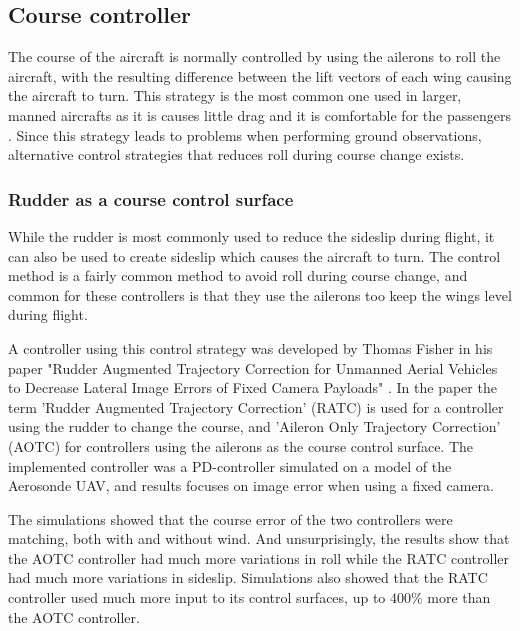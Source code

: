 \subsection{Course controller}
The course of the aircraft is normally controlled by using the ailerons to roll the aircraft, with the resulting difference between the lift vectors of each wing causing the aircraft to turn. This strategy is the most common one used in larger, manned aircrafts as it is causes little drag and it is comfortable for the passengers \cite{skidToTurnMills}. Since this strategy leads to problems when performing ground observations, alternative control strategies that reduces roll during course change exists.

\subsubsection{Rudder as a course control surface}
While the rudder is most commonly used to reduce the sideslip during flight, it can also be used to create sideslip which causes the aircraft to turn. The control method is a fairly common method to avoid roll during course change, and common for these controllers is that they use the ailerons too keep the wings level during flight.

A controller using this control strategy was developed by Thomas Fisher in his paper "Rudder Augmented Trajectory Correction for Unmanned Aerial Vehicles to Decrease Lateral Image Errors of Fixed Camera Payloads" \cite{ratcFISHER}. In the paper the term 'Rudder Augmented Trajectory Correction' (RATC) is used for a controller using the rudder to change the course, and 'Aileron Only Trajectory Correction' (AOTC) for controllers using the ailerons as the course control surface. The implemented controller was a PD-controller simulated on a model of the Aerosonde UAV, and results focuses on image error when using a fixed camera.


The simulations showed that the course error of the two controllers were matching, both with and without wind. And unsurprisingly, the results show that the AOTC controller had much more variations in roll while the RATC controller had much more variations in sideslip. Simulations also showed that the RATC controller used much more input to its control surfaces, up to $400 \%$ more than the AOTC controller.

